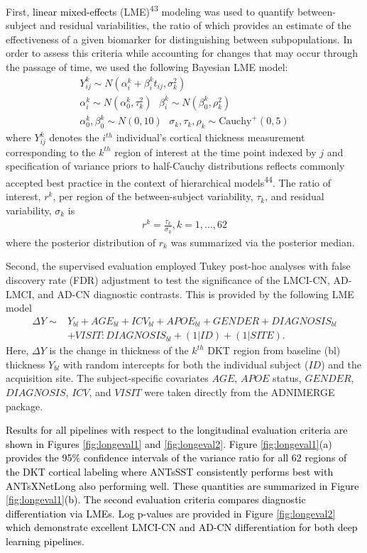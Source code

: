 \documentclass[12pt,]{article}
\begin{document}
First, \textcolor{black}{linear mixed-effects} (LME)\textsuperscript{43}
modeling was used to quantify between-subject and residual
variabilities, the ratio of which provides an estimate of the
effectiveness of a given biomarker for distinguishing between
subpopulations. In order to assess this criteria while accounting for
changes that may occur through the passage of time, we used the
following Bayesian LME model: \begin{gather}
  Y^k_{ij} \sim N(\alpha^k_i + \beta^k_i t_{ij}, \sigma_k^2) \\ \nonumber
  \alpha^k_i \sim N(\alpha^k_0, \tau^2_k) \,\,\,\, \beta^k_i \sim N(\beta^k_0, \rho^2_k) \\ \nonumber
  \alpha^k_0, \beta^k_0 \sim N(0,10) \,\,\,\,  \sigma_k, \tau_k, \rho_k \sim \mbox{Cauchy}^+ (0, 5)
\end{gather} where \(Y^k_{ij}\) denotes the \(i^{th}\) individual's
cortical thickness measurement corresponding to the \(k^{th}\) region of
interest at the time point indexed by \(j\) and specification of
variance priors to half-Cauchy distributions reflects commonly accepted
best practice in the context of hierarchical models\textsuperscript{44}.
The ratio of interest, \(r^k\), per region of the between-subject
variability, \(\tau_k\), and residual variability, \(\sigma_k\) is
\begin{align}
  r^k = \frac{\tau_k}{\sigma_k}, k = 1,\ldots,62
\end{align} where the posterior distribution of \(r_k\) was summarized
via the posterior median.

Second, the supervised evaluation employed Tukey post-hoc analyses with
false discovery rate (FDR) adjustment to test the significance of the
LMCI-CN, AD-LMCI, and AD-CN diagnostic contrasts. This is provided by
the following LME model \begin{align}
  \Delta Y \sim & Y_{bl} + AGE_{bl} + ICV_{bl} + APOE_{bl} + GENDER + DIAGNOSIS_{bl} \\ \nonumber
                & + VISIT:DIAGNOSIS_{bl} + (1 | ID) + (1 | SITE).
\end{align} Here, \(\Delta Y\) is the change in thickness of the
\(k^{th}\) DKT region from baseline (bl) thickness \(Y_{bl}\) with
random intercepts for both the individual subject (\(ID\)) and the
acquisition site. The subject-specific covariates \(AGE\), \(APOE\)
status, \(GENDER\), \(DIAGNOSIS\), \(ICV\), and \(VISIT\) were taken
directly from the ADNIMERGE package.

\textcolor{black}{Results for all pipelines with respect to the longitudinal
evaluation criteria are shown in Figures \ref{fig:longeval1} and
\ref{fig:longeval2}.  Figure \ref{fig:longeval1}(a) provides the 95\% confidence
intervals of the variance ratio for all 62 regions of the DKT cortical labeling
where ANTsSST consistently performs best with ANTsXNetLong also performing
well.  These quantities are summarized in Figure \ref{fig:longeval1}(b).  The
second evaluation criteria compares diagnostic differentiation via LMEs.  Log
p-values are provided in Figure \ref{fig:longeval2} which demonstrate excellent
LMCI-CN and AD-CN differentiation for both deep learning pipelines.}
\end{document}

